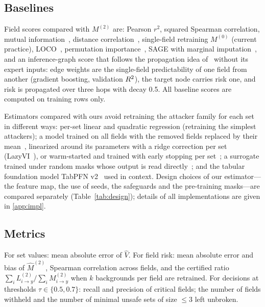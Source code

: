 \subsection{Baselines}
Field scores compared with $M^{(2)}$ are: Pearson $r^2$, squared Spearman correlation, mutual
information~\cite{kraskov2004mi}, distance correlation~\cite{szekely2007dcor}, single-field
retraining $M^{(0)}$ (current practice), LOCO~\cite{lei2018loco}, permutation
importance~\cite{breiman2001rf}, SAGE with marginal imputation~\cite{covert2020sage}, and an
inference-graph score that follows the propagation idea of~\cite{hu2026ignn} without its expert
inputs: edge weights are the single-field predictability of one field from another (gradient
boosting, validation $R^2$), the target node carries risk one, and risk is propagated over three
hops with decay 0.5. All baseline scores are computed on training rows only.

Estimators compared with ours avoid retraining the attacker family for each set in different ways:
per-set linear and quadratic regression (retraining the simplest attackers); a model trained on all fields with the removed
fields replaced by their mean~\cite{williamson2020spvim}, linearized around its parameters with a ridge correction per set
(LazyVI~\cite{gao2022lazyvi}), or warm-started and trained with early stopping per set~\cite{sun2025warmstart}; a
surrogate trained under random masks whose output is read directly~\cite{covert2021explaining,jethani2022fastshap}; and the
tabular foundation model TabPFN v2~\cite{hollmann2025tabpfn} used in context. Design choices of our estimator---the feature
map, the use of seeds, the safeguards and the pre-training masks---are compared separately (Table~\ref{tab:design}); details
of all implementations are given in \ref{app:impl}.

\subsection{Metrics}
For set values: mean absolute error of $\hat V$. For field risk: mean absolute error and bias of
$\hat M^{(2)}$, Spearman correlation across fields, and the certified ratio
$\sum_i L^{(2)}_{i\to y}/\sum_i M^{(2)}_{i\to y}$ when $k$ backgrounds per field are retrained.
For decisions at thresholds $\tau\in\{0.5,0.7\}$: recall and precision of critical fields; the
number of fields withheld and the number of minimal unsafe sets of size $\le 3$ left unbroken.
